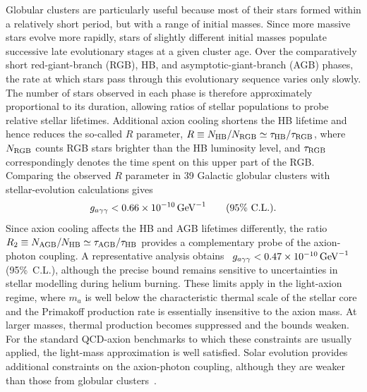 \documentclass[review]{elsarticle}
\numberwithin{equation}{section}
\numberwithin{table}{section}
\numberwithin{figure}{section}
\begin{document}
Globular clusters are particularly useful because most of their stars formed within a relatively short period, but with a range of initial masses. Since more massive stars evolve more rapidly, stars of slightly different initial masses populate successive late evolutionary stages at a given cluster age. Over the comparatively short red-giant-branch (RGB), HB, and asymptotic-giant-branch (AGB) phases, the rate at which stars pass through this evolutionary sequence varies only slowly. The number of stars observed in each phase is therefore approximately proportional to its duration, allowing ratios of stellar populations to probe relative stellar lifetimes. Additional axion cooling shortens the HB lifetime and hence reduces the so-called $R$ parameter, $R\equiv N_{\rm HB}/N_{\rm RGB}\simeq\tau_{\rm HB}/\tau_{\rm RGB}$,
where $N_{\rm RGB}$ counts RGB stars brighter than the HB luminosity level, and $\tau_{\rm RGB}$ correspondingly denotes the time spent on this upper part of the RGB. Comparing the observed $R$ parameter in 39 Galactic globular clusters with stellar-evolution calculations gives~\cite{Ayala:2014pea}
\begin{align}
    g_{a\gamma\gamma}
    <
    0.66\times10^{-10}\,{\rm GeV}^{-1}
    \qquad
    (95\%~{\rm C.L.}).
    \label{eq:HB-axion-photon-bound}
\end{align}
Since axion cooling affects the HB and AGB lifetimes differently, the ratio
$R_2\equiv N_{\rm AGB}/N_{\rm HB}\simeq\tau_{\rm AGB}/\tau_{\rm HB}$
provides a complementary probe of the axion-photon coupling. A representative analysis obtains~\cite{Dolan:2022kul}
$g_{a\gamma\gamma}<0.47\times10^{-10}\,{\rm GeV}^{-1}$ (95\%~{\rm C.L.}),
although the precise bound remains sensitive to uncertainties in stellar modelling during helium burning. These limits apply in the light-axion regime, where $m_a$ is well below the characteristic thermal scale of the stellar core and the Primakoff production rate is essentially insensitive to the axion mass. At larger masses, thermal production becomes suppressed and the bounds weaken. For the standard QCD-axion benchmarks to which these constraints are usually applied, the light-mass approximation is well satisfied. Solar evolution provides additional constraints on the axion-photon coupling, although they are weaker than those from globular clusters~\cite{Vinyoles:2015aba}.
\end{document}
